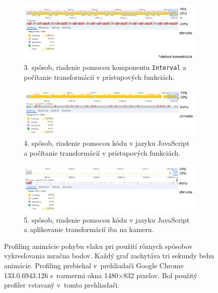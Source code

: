 \begin{figure}
    \centering
    \begin{subfigure}[b]{1\textwidth}
        \centering
        \includegraphics[width=1\linewidth]{text_prace/obrazky-figures/profiling_interval.pdf}
        \caption{3. spôsob, riadenie pomocou komponentu \texttt{Interval} a počítanie transformácií v prístupových funkciách.}
        \label{fig:profiling_interval}
    \end{subfigure}
    \hfill
    \begin{subfigure}[b]{1\textwidth}
        \centering
        \includegraphics[width=1\linewidth]{text_prace/obrazky-figures/profiling1.pdf}
        \caption{4. spôsob, riadenie pomocou kódu v jazyku JavaScript a počítanie transformácií v prístupových funkciách.}
        \label{fig:profiling1}
    \end{subfigure}
    \hfill
    \begin{subfigure}[b]{1\textwidth}
        \centering
        \includegraphics[width=1\linewidth]{text_prace/obrazky-figures/profiling2.pdf}
        \caption{5. spôsob, riadenie pomocou kódu v jazyku JavaScript a aplikovanie transformácií iba na kameru.}
        \label{fig:profiling2}
    \end{subfigure}
    \caption{Profiling animácie pohybu vlaku pri použití rôznych spôsobov vykresľovania mračna bodov. Každý graf zachytáva tri sekundy behu animácie. Profiling prebiehal v~prehliadači Google Chrome 133.0.6943.126 s~rozmermi okna 1480×832 pixelov. Bol použitý profiler vstavaný v~tomto prehliadači.}
    \label{fig:profiling}
\end{figure}


